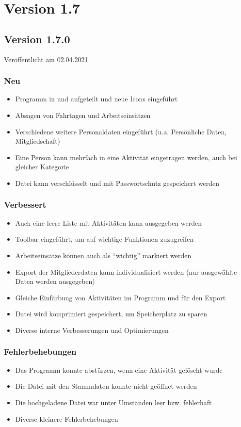 \section{Version 1.7}\label{version:1:6}
\subsection{Version 1.7.0}
\label{version:1:7:0}
Veröffentlicht am 02.04.2021
\subsubsection{Neu}
\begin{itemize}
  \item
  Programm in \Einsatz und \Personal aufgeteilt und neue Icons eingeführt
  \item
  Absagen von Fahrtagen und Arbeitseinsätzen
  \item
  Verschiedene weitere Personaldaten eingeführt (u.a. Persönliche Daten, Mitgliedschaft)
  \item
  Eine Person kann mehrfach in eine Aktivität eingetragen werden, auch bei gleicher Kategorie
  \item
  Datei kann verschlüsselt und mit Passwortschutz gespeichert werden

\end{itemize}

\subsubsection{Verbessert}
\begin{itemize}
  \item
  Auch eine leere Liste mit Aktivitäten kann ausgegeben werden
  \item
  Toolbar eingeführt, um auf wichtige Funktionen zuzugreifen
  \item
  Arbeitseinsätze können auch als "`wichtig"' markiert werden
  \item
  Export der Mitgliederdaten kann individualisiert werden (nur ausgewählte Daten werden ausgegeben)
  \item
  Gleiche Einfärbung von Aktivitäten im Programm und für den Export
  \item
  Datei wird komprimiert gespeichert, um Speicherplatz zu sparen
  \item
  Diverse interne Verbesserungen und Optimierungen
\end{itemize}

\subsubsection{Fehlerbehebungen}
\begin{itemize}
  \item
  Das Programm konnte abstürzen, wenn eine Aktivität gelöscht wurde
  \item
  Die Datei mit den Stammdaten konnte nicht geöffnet werden
  \item
  Die hochgeladene Datei war unter Umständen leer bzw. fehlerhaft
  \item
  Diverse kleinere Fehlerbehebungen
\end{itemize}


